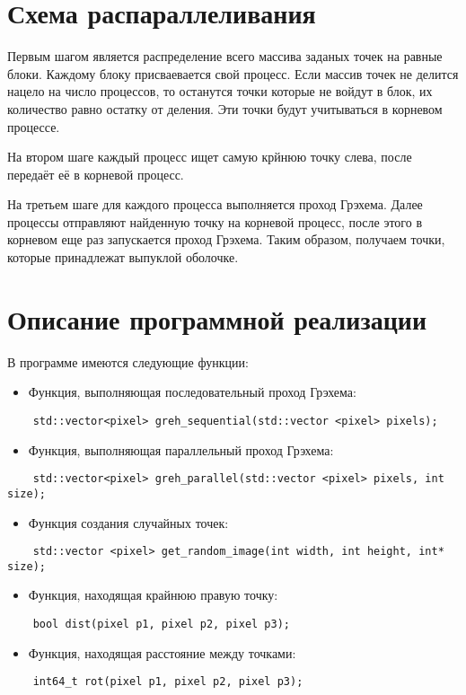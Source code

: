 \documentclass{report}
\begin{document}
\section*{Схема распараллеливания}
Первым шагом является распределение всего массива заданых точек на равные блоки. Каждому блоку присваевается свой процесс. Если массив точек не делится нацело на число процессов, то останутся точки которые не войдут в блок, их количество равно остатку от деления. Эти точки будут учитываться в корневом процессе.
\par
На втором шаге каждый процесс ищет самую крйнюю точку слева, после передаёт её в корневой процесс.
\par
На третьем шаге для каждого процесса выполняется проход Грэхема. Далее процессы отправляют найденную точку на корневой процесс, после этого в корневом еще раз запускается проход Грэхема. Таким образом, получаем точки, которые принадлежат выпуклой оболочке.  
\newpage

\section*{Описание программной реализации}
В программе имеются следующие функции:
\begin{itemize}
\item Функция, выполняющая последовательный проход Грэхема: 
\end{itemize}
\begin{lstlisting}
	std::vector<pixel> greh_sequential(std::vector <pixel> pixels);
\end{lstlisting}
\begin{itemize}
\item Функция, выполняющая параллельный проход Грэхема: 
\end{itemize}
\begin{lstlisting}
	std::vector<pixel> greh_parallel(std::vector <pixel> pixels, int size);
\end{lstlisting}
\begin{itemize}
\item Функция создания случайных точек:
\end{itemize}
\begin{lstlisting}
	std::vector <pixel> get_random_image(int width, int height, int* size);
\end{lstlisting}
\begin{itemize}
\item Функция, находящая крайнюю правую точку: 
\end{itemize}
\begin{lstlisting}
	bool dist(pixel p1, pixel p2, pixel p3);
\end{lstlisting}
\begin{itemize}
\item Функция, находящая расстояние между точками: 
\end{itemize}
\begin{lstlisting}
	int64_t rot(pixel p1, pixel p2, pixel p3);
\end{lstlisting}
\newpage
\end{document}
